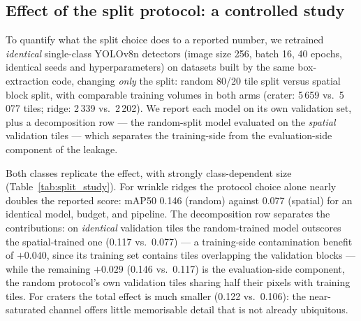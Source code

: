 \documentclass{aa}
\begin{document}
\subsection{Effect of the split protocol: a controlled study}
\label{sec:split_study}

To quantify what the split choice does to a reported number, we retrained \emph{identical} single-class YOLOv8n detectors (image size 256, batch 16, 40 epochs, identical seeds and hyperparameters) on datasets built by the same box-extraction code, changing \emph{only} the split: random 80/20 tile split versus spatial block split, with comparable training volumes in both arms (crater: 5\,659 vs.\ 5\,077 tiles; ridge: 2\,339 vs.\ 2\,202). We report each model on its own validation set, plus a decomposition row --- the random-split model evaluated on the \emph{spatial} validation tiles --- which separates the training-side from the evaluation-side component of the leakage.

\begin{table}[htbp]
\centering
\caption{Split-protocol study: identical YOLOv8n detectors, identical budget (40 epochs), different train/validation split. ``Random $\to$ spatial'' evaluates the random-split model on the spatial validation tiles.}
\label{tab:split_study}
\end{table}

Both classes replicate the effect, with strongly class-dependent size (Table~\ref{tab:split_study}). For wrinkle ridges the protocol choice alone nearly doubles the reported score: mAP50 0.146 (random) against 0.077 (spatial) for an identical model, budget, and pipeline. The decomposition row separates the contributions: on \emph{identical} validation tiles the random-trained model outscores the spatial-trained one (0.117 vs.\ 0.077) --- a training-side contamination benefit of $+0.040$, since its training set contains tiles overlapping the validation blocks --- while the remaining $+0.029$ (0.146 vs.\ 0.117) is the evaluation-side component, the random protocol's own validation tiles sharing half their pixels with training tiles. For craters the total effect is much smaller (0.122 vs.\ 0.106): the near-saturated channel offers little memorisable detail that is not already ubiquitous.
\end{document}
